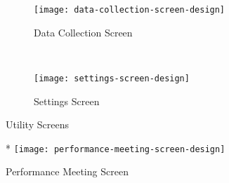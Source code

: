 \begin{figure*}[ht]
    \centering
    \begin{subfigure}[t]{0.4\textwidth}
        \centering
        \texttt{[image: data-collection-screen-design]}
        \caption{Data Collection Screen}
        \label{fig:data-collection-screen-design}
    \end{subfigure}%
    ~ 
    \begin{subfigure}[t]{0.4\textwidth}
        \centering
        \texttt{[image: settings-screen-design]}
        \caption{Settings Screen}
    \end{subfigure}
    \caption{Utility Screens}
\end{figure*}


\begin{figure}*
    \centering
    \texttt{[image: performance-meeting-screen-design]}
    \caption{Performance Meeting Screen}
    \label{fig:performance-meeting-screen-design}
\end{figure}